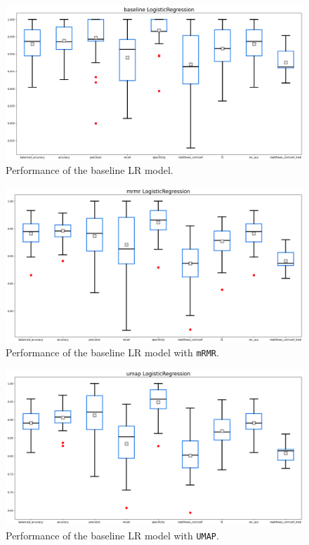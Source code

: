 \documentclass[12pt]{article}
\begin{document}
\begin{figure}[H]
    \centering
    \includegraphics[width=\textwidth]{ims/baseline_logistic.png}
    \caption{Performance of the baseline LR model.}
    \label{fig:baseline_logistic}
\end{figure}

\begin{figure}[H]
    \centering
    \includegraphics[width=\textwidth]{ims/mrmr_logistic.png}
    \caption{Performance of the baseline LR model with \texttt{mRMR}.}
    \label{fig:mrmr_logistic}
\end{figure}

\begin{figure}[H]
    \centering
    \includegraphics[width=\textwidth]{ims/umap_logistic.png}
    \caption{Performance of the baseline LR model with \texttt{UMAP}.}
    \label{fig:umap_logistic}
\end{figure}
\end{document}
